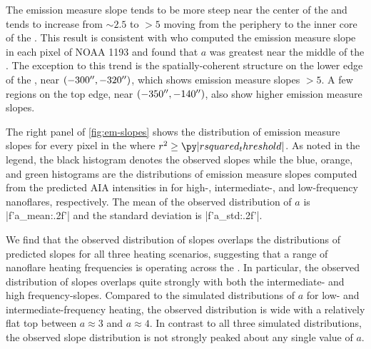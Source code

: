 
The emission measure slope tends to be more steep near the center of the \AR{} and tends to increase from $\sim2.5$ to $>5$ moving from the periphery to the inner core of the \AR{}.
This result is consistent with \citet{del_zanna_evolution_2015} who computed the emission measure slope in each pixel of \AR{} NOAA 1193 and found that $a$ was greatest near the middle of the \AR{}.
The exception to this trend is the spatially-coherent structure on the lower edge of the \AR{}, near $(-300\mbox{$^{\prime\prime}$},-320\mbox{$^{\prime\prime}$})$, which shows emission measure slopes $>5$.
A few regions on the top edge, near $(-350\mbox{$^{\prime\prime}$},-140\mbox{$^{\prime\prime}$})$, also show higher emission measure slopes.

The right panel of \autoref{fig:em-slopes} shows the distribution of emission measure slopes for every pixel in the \AR{} where $r^2\ge\py|rsquared_threshold|$.
As noted in the legend, the black histogram denotes the observed slopes while the blue, orange, and green histograms are the distributions of emission measure slopes computed from the predicted AIA intensities in  for high-, intermediate-, and low-frequency nanoflares, respectively.
The mean of the observed distribution of $a$ is \py[manager_em]|f'{a_mean:.2f}'| and the standard deviation is \py[manager_em]|f'{a_std:.2f}'|. 

We find that the observed distribution of slopes overlaps the distributions of predicted slopes for all three heating scenarios, suggesting that  a range of nanoflare heating frequencies is operating across the \AR.
In particular, the observed distribution of slopes overlaps quite strongly with both the intermediate- and high frequency-slopes.
Compared to the simulated distributions of $a$ for low- and intermediate-frequency heating, the observed distribution is wide with a relatively flat top between $a\approx3$ and $a\approx4$.
In contrast to all three simulated distributions, the observed slope distribution is not strongly peaked about any single value of $a$.

